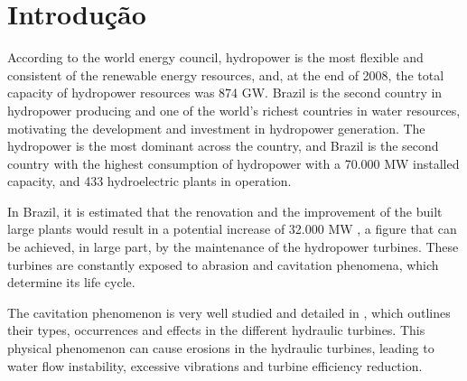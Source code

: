 \section{Introdução}
According to the world energy council, hydropower is the most flexible and
consistent of the renewable energy resources, and, at the end of 2008, the total
capacity of hydropower resources was 874 GW. Brazil is the second
country in hydropower producing and one of the world's richest countries in
water resources, motivating the development and investment in hydropower
generation. The hydropower is the most dominant across the country, and Brazil
is the second country with the highest consumption of hydropower with a 70.000
MW installed capacity, and 433 hydroelectric plants in operation.


In Brazil, it is estimated that the renovation and the improvement of the built
large plants would result in a potential increase of 32.000 MW
\citep{goldemberg2007energia}, a figure that can be achieved, in large part, by
the maintenance of the hydropower turbines. These turbines are constantly
exposed to abrasion and cavitation phenomena, which determine its life cycle.

The cavitation phenomenon is very well studied and detailed in
\cite{escaler2006detection}, which outlines their types, occurrences and
effects in the different hydraulic turbines. This physical phenomenon can cause
erosions in the hydraulic turbines, leading to water flow instability,
excessive vibrations and turbine efficiency reduction.

